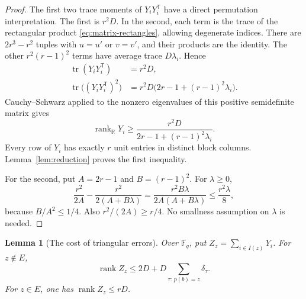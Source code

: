 \documentclass[11pt]{amsart}
\newtheorem{lemma}[theorem]{Lemma}
\theoremstyle{definition}
\theoremstyle{remark}
\numberwithin{equation}{section}
\newcommand{\F}{\mathbb F}
\newcommand{\R}{\mathbb R}
\DeclareMathOperator{\rank}{rank}
\DeclareMathOperator{\tr}{tr}
\begin{document}
\begin{proof}
The first two trace moments of $Y_iY_i^{\mathsf T}$ have a direct
permutation interpretation. The first is $r^2D$. In the second, each
term is the trace of the rectangular product
\eqref{eq:matrix-rectangles}, allowing degenerate indices. There are
$2r^3-r^2$ tuples with $u=u'$ or $v=v'$, and their products are the
identity. The other $r^2(r-1)^2$ terms have average trace
$D\lambda_i$. Hence
\begin{align*}
 \tr(Y_iY_i^{\mathsf T})&=r^2D,\\
 \tr\bigl((Y_iY_i^{\mathsf T})^2\bigr)
   &=r^2D\bigl(2r-1+(r-1)^2\lambda_i\bigr).
\end{align*}
Cauchy--Schwarz applied to the nonzero eigenvalues of this positive
semidefinite matrix gives
\[
 \rank_\R Y_i\ge
 \frac{r^2D}{2r-1+(r-1)^2\lambda_i}.
\]
Every row of $Y_i$ has exactly $r$ unit entries in distinct block
columns. Lemma~\ref{lem:reduction} proves the first inequality.

For the second, put $A=2r-1$ and $B=(r-1)^2$. For $\lambda\ge0$,
\[
 \frac{r^2}{2A}-\frac{r^2}{2(A+B\lambda)}
 =\frac{r^2B\lambda}{2A(A+B\lambda)}
 \le\frac{r^2\lambda}{8},
\]
because $B/A^2\le1/4$. Also $r^2/(2A)\ge r/4$.
No smallness assumption on $\lambda$ is needed.
\end{proof}

\begin{lemma}[The cost of triangular errors]\label{lem:triangle-rank}
Over $\F_q$, put $Z_z=\sum_{i\in I(z)}Y_i$. For $z\notin E$,
\begin{equation}\label{eq:point-rank}
 \rank Z_z\le 2D+
 D\sum_{\tau:\,p(b)=z}\delta_\tau.
\end{equation}
For $z\in E$, one has $\rank Z_z\le rD$.
\end{lemma}
\end{document}
